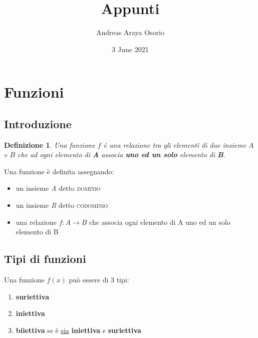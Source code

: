 \documentclass[12pt, a4paper]{article}
\title{Appunti}
\author{Andreas Araya Osorio}
\date{3 June 2021}
\theoremstyle{break}
\newtheorem{defn}{Definizione}
\theoremstyle{lemma}
\theoremstyle{lemma}
\theoremstyle{lemma}
\begin{document}
\maketitle

\section{Funzioni}

\subsection{Introduzione}

\begin{defn}
Una funzione $f$ é una relazione tra gli elementi di due insieme $A$ e $B$ che ad ogni elemento di \textbf{A} associa \textbf{uno ed un solo} elemento di \textbf{B}.
\end{defn}


Una funzione è definita assegnando:
\begin{itemize}
\item un insieme \textit{A} detto  \textsc{dominio}
\item un insieme \textit{B} detto \textsc{codominio}
\item una relazione $f: A \rightarrow B$ che associa ogni elemento di A uno ed un solo elemento di B
\end{itemize}


\subsection{Tipi di funzioni}

Una funzione $f(x)$ può essere di 3 tipi:
\begin{enumerate}
    \item \textbf{suriettiva}
    \item \textbf{iniettiva}
    \item \textbf{biiettiva} se è \underline{sia} \textbf{iniettiva} e  \textbf{suriettiva}
    \end{enumerate}
\end{document}
